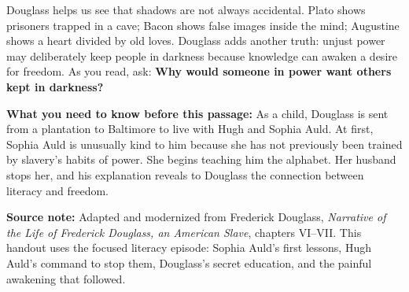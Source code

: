 \documentclass[12pt]{article}
\newcommand{\focusbox}[1]{%
\vspace{0.4em}\noindent\colorbox{gray!12}{\begin{minipage}{0.96\linewidth}#1\end{minipage}}\vspace{0.5em}}
\begin{document}
Douglass helps us see that shadows are not always accidental. Plato shows prisoners trapped in a cave; Bacon shows false images inside the mind; Augustine shows a heart divided by old loves. Douglass adds another truth: unjust power may deliberately keep people in darkness because knowledge can awaken a desire for freedom. As you read, ask: \textbf{Why would someone in power want others kept in darkness?}

\focusbox{\textbf{What you need to know before this passage:} As a child, Douglass is sent from a plantation to Baltimore to live with Hugh and Sophia Auld. At first, Sophia Auld is unusually kind to him because she has not previously been trained by slavery's habits of power. She begins teaching him the alphabet. Her husband stops her, and his explanation reveals to Douglass the connection between literacy and freedom.}

\focusbox{\textbf{Source note:} Adapted and modernized from Frederick Douglass, \textit{Narrative of the Life of Frederick Douglass, an American Slave}, chapters VI--VII. This handout uses the focused literacy episode: Sophia Auld's first lessons, Hugh Auld's command to stop them, Douglass's secret education, and the painful awakening that followed.}
\end{document}
